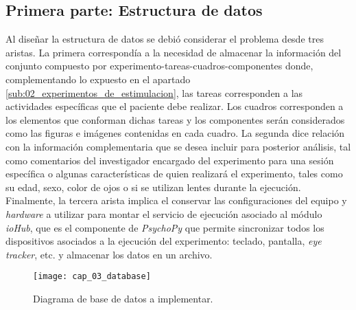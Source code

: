 \documentclass[\main/Main.tex]{subfiles}
\begin{document}
		\subsection{Primera parte: Estructura de datos}
		\label{sub:03_estructura_datos}
			Al diseñar la estructura de datos se debió considerar el problema desde tres aristas. La primera correspondía a la necesidad de almacenar la información del conjunto compuesto por experimento-tareas-cuadros-componentes donde, complementando lo expuesto en el apartado \ref{sub:02_experimentos_de_estimulacion}, las tareas corresponden a las actividades específicas que el paciente debe realizar. Los cuadros corresponden a los elementos que conforman dichas tareas y los componentes serán considerados como las figuras e imágenes contenidas en cada cuadro. La segunda dice relación con la información complementaria que se desea incluir para posterior análisis, tal como comentarios del investigador encargado del experimento para una sesión específica o algunas características de quien realizará el experimento, tales como su edad, sexo, color de ojos o si se utilizan lentes durante la ejecución. Finalmente, la tercera arista implica el conservar las configuraciones del equipo y \textit{hardware} a utilizar para montar el servicio de ejecución asociado al módulo \textit{ioHub}, que es el componente de \textit{PsychoPy} que permite sincronizar todos los dispositivos asociados a la ejecución del experimento: teclado, pantalla, \textit{eye tracker}, etc. y almacenar los datos en un archivo. 
			\begin{figure}[H]
				\centering
				\texttt{[image: cap\_03\_database]}
				\caption{Diagrama de base de datos a implementar.}
				\label{fig:03_database}
			\end{figure} 
\end{document}

